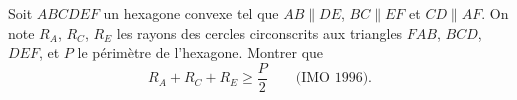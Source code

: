 Soit $ABCDEF$ un hexagone convexe tel que $AB \parallel DE$, $BC \parallel EF$ et $CD \parallel AF$. On note $R_A$, $R_C$, $R_E$ les rayons des cercles circonscrits aux triangles $FAB$, $BCD$, $DEF$, et $P$ le périmètre de l'hexagone. Montrer que
\[ R_A + R_C + R_E \geq \frac{P}{2} \qquad \text{(IMO 1996).} \]
